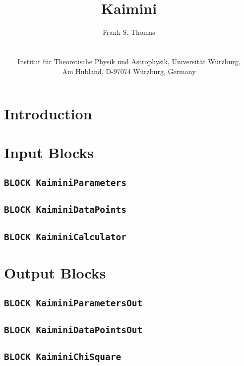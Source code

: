 \documentclass[a4paper,12pt]{article}
\title{\textbf{Kaimini}}
\author{
  Frank S. Thomas\\
  \texttt{\mailto{fthomas@physik.uni-wuerzburg.de}}\\
  \vspace{1em}\\
  Institut für Theoretische Physik und Astrophysik, Universität Würzburg,\\
  Am Hubland, D-97074 Würzburg, Germany
}
\begin{document}
\maketitle

\begin{abstract}
\end{abstract}

\tableofcontents

\section{Introduction}

\cite{Skands:2003cj}

\section{Input Blocks}

\subsection*{\tt{BLOCK KaiminiParameters}}

\subsection*{\tt{BLOCK KaiminiDataPoints}}

\subsection*{\tt{BLOCK KaiminiCalculator}}

\section{Output Blocks}

\subsection*{\tt{BLOCK KaiminiParametersOut}}

\subsection*{\tt{BLOCK KaiminiDataPointsOut}}

\subsection*{\tt{BLOCK KaiminiChiSquare}}
\end{document}

